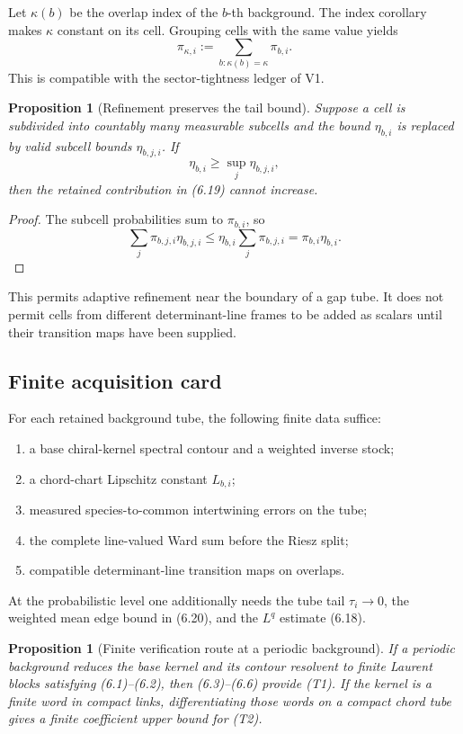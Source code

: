 \documentclass[11pt]{article}
\newtheorem{proposition}[theorem]{Proposition}
\begin{document}
Let \(\kappa(b)\) be the overlap index of the \(b\)-th background.  The
index corollary makes \(\kappa\) constant on its cell.  Grouping cells with
the same value yields
\[
 \pi_{\kappa,i}:=
 \sum_{b:\kappa(b)=\kappa}\pi_{b,i}.
 \tag{6.21}
\]
This is compatible with the sector-tightness ledger of V1.

\begin{proposition}[Refinement preserves the tail bound]
\label{prop:v11v6-refinement}
Suppose a cell is subdivided into countably many measurable subcells and
the bound \(\eta_{b,i}\) is replaced by valid subcell bounds
\(\eta_{b,j,i}\).  If
\[
 \eta_{b,i}\geq\sup_j\eta_{b,j,i},
 \tag{6.22}
\]
then the retained contribution in (6.19) cannot increase.
\end{proposition}

\begin{proof}
The subcell probabilities sum to \(\pi_{b,i}\), so
\[
 \sum_j\pi_{b,j,i}\eta_{b,j,i}
 \leq
 \eta_{b,i}\sum_j\pi_{b,j,i}
 =
 \pi_{b,i}\eta_{b,i}.
\]
\end{proof}

This permits adaptive refinement near the boundary of a gap tube.  It
does not permit cells from different determinant-line frames to be added
as scalars until their transition maps have been supplied.

\subsection{Finite acquisition card}

For each retained background tube, the following finite data suffice:
\begin{enumerate}[label=\textnormal{(T\arabic*)}]
\item a base chiral-kernel spectral contour and a weighted inverse stock;
\item a chord-chart Lipschitz constant \(L_{b,i}\);
\item measured species-to-common intertwining errors on the tube;
\item the complete line-valued Ward sum before the Riesz split;
\item compatible determinant-line transition maps on overlaps.
\end{enumerate}
At the probabilistic level one additionally needs the tube tail
\(\tau_i\to0\), the weighted mean edge bound in (6.20), and the
\(L^q\) estimate (6.18).

\begin{proposition}[Finite verification route at a periodic background]
\label{prop:v11v6-finite-route}
If a periodic background reduces the base kernel and its contour
resolvent to finite Laurent blocks satisfying (6.1)--(6.2), then
(6.3)--(6.6) provide (T1).  If the kernel is a finite word in compact
links, differentiating those words on a compact chord tube gives a finite
coefficient upper bound for (T2).
\end{proposition}
\end{document}

